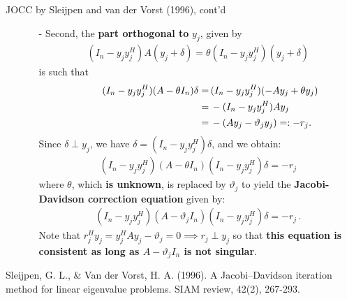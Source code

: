 \documentclass[t,usepdftitle=false]{beamer}
\begin{document}
\begin{frame}{JOCC by Sleijpen and van der Vorst (1996), cont'd}
\begin{itemize}
\item[]
\begin{itemize}\normalsize
\item[-] Second, the \textbf{part orthogonal to} $y_j$, given by
\begin{align*}
(I_n-y_jy_j^H)A(y_j+\delta)=\theta (I_n-y_jy_j^H)(y_j+\delta)
\end{align*}
is such that\vspace{-.65cm}
\begin{align*}
\hspace{.9cm}
(I_n-y_jy_j^H)(A-\theta I_n)\delta
=&\,(I_n-y_jy_j^H)(-Ay_j+\theta y_j)\\
=&\,-(I_n-y_jy_j^H)Ay_j\\
=&\,-(Ay_j-\vartheta_jy_j)=:-r_j.
\end{align*}
Since $\delta\perp y_j$, we have $\delta=(I_n-y_jy_j^H)\delta$, and we obtain:
\begin{align*}
(I_n-y_jy_j^H)(A-\theta I_n)(I_n-y_jy_j^H)\delta=-r_j
\end{align*}
where $\theta$, which \textbf{is unknown}, is replaced by $\vartheta_j$ to yield the \textbf{Jacobi-Davidson correction equation} given by:
\begin{align*}
\boxed{
(I_n-y_jy_j^H)(A-\vartheta_j I_n)(I_n-y_jy_j^H)\delta=-r_j
}\,.
\end{align*}
Note that $r_j^Hy_j=y_j^HAy_j-\vartheta_j=0\implies r_j\perp y_j$ so that \textbf{this equation is consistent as long as $A-\vartheta_j I_n$ is not singular}.
\end{itemize}
\end{itemize}\smallskip
\tiny{Sleijpen, G. L., \& Van der Vorst, H. A. (1996). A Jacobi--Davidson iteration method for linear eigenvalue problems. SIAM review, 42(2), 267-293.}
\end{frame}
\end{document}
